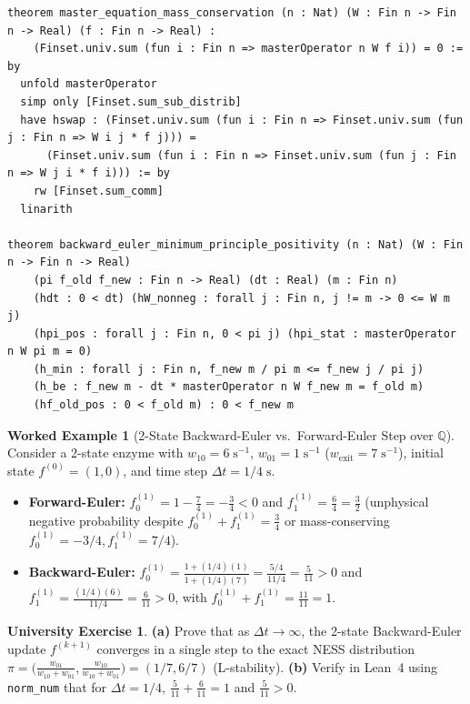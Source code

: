 \documentclass[11pt,a4paper]{article}
\theoremstyle{definition}
\newtheorem{example_box}[theorem]{Worked Example}
\newtheorem{exercise}[theorem]{University Exercise}
\theoremstyle{remark}
\begin{document}
\begin{lstlisting}
theorem master_equation_mass_conservation (n : Nat) (W : Fin n -> Fin n -> Real) (f : Fin n -> Real) :
    (Finset.univ.sum (fun i : Fin n => masterOperator n W f i)) = 0 := by
  unfold masterOperator
  simp only [Finset.sum_sub_distrib]
  have hswap : (Finset.univ.sum (fun i : Fin n => Finset.univ.sum (fun j : Fin n => W i j * f j))) =
      (Finset.univ.sum (fun i : Fin n => Finset.univ.sum (fun j : Fin n => W j i * f i))) := by
    rw [Finset.sum_comm]
  linarith

theorem backward_euler_minimum_principle_positivity (n : Nat) (W : Fin n -> Fin n -> Real)
    (pi f_old f_new : Fin n -> Real) (dt : Real) (m : Fin n)
    (hdt : 0 < dt) (hW_nonneg : forall j : Fin n, j != m -> 0 <= W m j)
    (hpi_pos : forall j : Fin n, 0 < pi j) (hpi_stat : masterOperator n W pi m = 0)
    (h_min : forall j : Fin n, f_new m / pi m <= f_new j / pi j)
    (h_be : f_new m - dt * masterOperator n W f_new m = f_old m)
    (hf_old_pos : 0 < f_old m) : 0 < f_new m
\end{lstlisting}

\begin{example_box}[2-State Backward-Euler vs.\ Forward-Euler Step over $\mathbb{Q}$]
Consider a 2-state enzyme with $w_{10} = 6\;\mathrm{s}^{-1}$, $w_{01} = 1\;\mathrm{s}^{-1}$ ($w_{\mathrm{exit}} = 7\;\mathrm{s}^{-1}$), initial state $f^{(0)} = (1, 0)$, and time step $\Delta t = 1/4\;\mathrm{s}$.
\begin{itemize}
  \item \textbf{Forward-Euler:} $f_0^{(1)} = 1 - \frac{7}{4} = -\frac{3}{4} < 0$ and $f_1^{(1)} = \frac{6}{4} = \frac{3}{2}$ (unphysical negative probability despite $f_0^{(1)} + f_1^{(1)} = \frac{3}{4}$ or mass-conserving $f_0^{(1)} = -3/4, f_1^{(1)} = 7/4$).
  \item \textbf{Backward-Euler:} $f_0^{(1)} = \frac{1 + (1/4)(1)}{1 + (1/4)(7)} = \frac{5/4}{11/4} = \frac{5}{11} > 0$ and $f_1^{(1)} = \frac{(1/4)(6)}{11/4} = \frac{6}{11} > 0$, with $f_0^{(1)} + f_1^{(1)} = \frac{11}{11} = 1$.
\end{itemize}
\end{example_box}

\begin{exercise}
\textbf{(a)} Prove that as $\Delta t \to \infty$, the 2-state Backward-Euler update $f^{(k+1)}$ converges in a single step to the exact NESS distribution $\pi = \bigl(\frac{w_{01}}{w_{10}+w_{01}}, \frac{w_{10}}{w_{10}+w_{01}}\bigr) = (1/7, 6/7)$ (L-stability).
\textbf{(b)} Verify in Lean~4 using \texttt{norm\_num} that for $\Delta t = 1/4$, $\frac{5}{11} + \frac{6}{11} = 1$ and $\frac{5}{11} > 0$.
\end{exercise}
\end{document}
